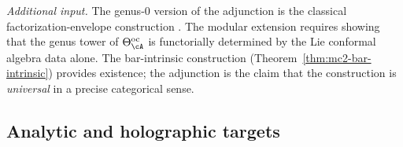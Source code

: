 \begin{enumerate}[resume, label=\textup{(\arabic*)}]
 \smallskip\noindent
 \emph{Additional input.}
 The genus-$0$ version of the adjunction is the classical
 factorization-envelope construction
 \cite[\S3.7]{BD04}. The modular extension requires
 showing that the genus tower of $\Theta^{\mathrm{oc}}_\cA$
 is functorially determined by the Lie conformal algebra data
 alone. The bar-intrinsic construction
 (Theorem~\ref{thm:mc2-bar-intrinsic}) provides existence;
 the adjunction is the claim that the construction is
 \emph{universal} in a precise categorical sense.

\end{enumerate}

\subsection{Analytic and holographic targets}


